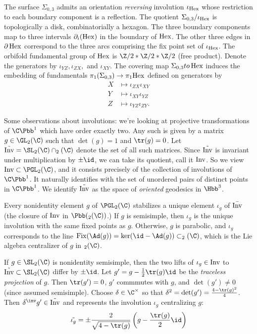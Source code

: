 \documentclass[11pt]{amsart}
\begin{document}
The surface $\Sigma_{0,3}$ admits an orientation \emph{reversing} involution $\iota_{\operatorname{Hex}}$  whose restriction to each boundary component is a reflection. The quotient $\Sigma_{0,3}/\iota_{\operatorname{Hex}}$ is topologically a disk, combinatorially a hexagon. The three boundary components map to three intervals $\partial_i (\operatorname{Hex})$ in the boundary of $\operatorname{Hex}$. The other three edges in $\partial \operatorname{Hex}$ correspond to the three arcs comprising the fix point set of $\iota_{\operatorname{Hex}}$. The orbifold fundamental group of $\operatorname{Hex}$ is $\Z/2 * \Z/2 *\Z/2$ (free product). Denote the generators by $\iota_{YZ}, \iota_{ZX},$ and $\iota_{XY}$. The covering map $\Sigma_{0,3} to \operatorname{Hex}$ induces the embedding of fundamentals $\pi_1(\Sigma_{0,3}) \to \pi_1{\operatorname{Hex}}$ defined on generators by 
\begin{align*}
	X &\mapsto	\iota_{ZX}\iota_{XY} \\
	Y &\mapsto \iota_{XY}\iota_{YZ} \\
	Z &\mapsto \iota_{YZ}\iota_{ZY}.
\end{align*}

Some observations about involutions: we're looking at projective transformations of $\C\Pbb^1$ which have order exactly two. Any such is given by a matrix $g\in \GL_2(\C)$ such that $\det(g)=1$ and $\tr(g)=0$. Let $\tilde{\Invo}=\SL_2(\C) \cap \sl_2(\C)$ denote the set of all such matrices. Since $\tilde{\operatorname{Inv}}$ is invariant under multiplication by $\pm \id$, we can take its quotient, call it $\operatorname{Inv}$. So we view $\Invo \subset \PGL_2(\C)$, and it consists precisely of the collection of involutions of $\C\Pbb^1$. It naturally identifies with the set of unordered pairs of distinct points in $\C\Pbb^1$. We identify $\tilde{\operatorname{Inv}}$ as the space of \emph{oriented} geodesics in $\Hbb^3$. 

Every nonidentity element $g$ of $\PGL_2(\C)$ stabilizes a unique element $\iota_g$ of $\bar{\operatorname{Inv}}$ (the closure of $\operatorname{Inv}$ in $\Pbb(\sl_2(\C))$.) If  $g$ is semisimple, then $\iota_g$ is the unique involution with the same fixed points as $g$. Otherwise, $g$ is parabolic, and $\iota_g$ corresponds to the line $\Fix(\Ad(g))=\ker(\id -\Ad(g))\subset \sl_2(\C)$, which is the Lie algebra centralizer of $g$ in $\sl_2(\C)$. 

If $g\in \SL_2(\C)$ is nonidentity semisimple, then the two lifts of $\iota_g \in \operatorname{Inv}$ to $\tilde{\Invo} \subset \SL_2(\C)$ differ by $\pm \id$. Let $g'= g-\frac{1}{2} \tr(g) \id$  be the \emph{traceless projection} of $g$. Then $\tr(g')=0$, $g'$ commmutes with $g$, and $\det(g')\neq 0$ (since assumed semisimple).  Choose $\delta \in \C^\times$ so that $\delta^2 =\det(g')=\frac{4 -\tr(g)^2}{4}$. Then $\delta^\inv g' \in \tilde{\Invo}$ and represents the involution $\iota_g$ centralizing $g$: \[\tilde{\iota_g}=\pm \frac{2}{\sqrt{4-\tr(g)}}\lp g-\frac{\tr(g)}{2} \id \rp\]
\end{document}
